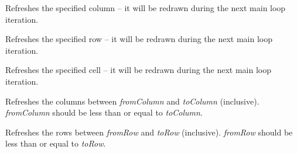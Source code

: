 
Refreshes the specified column -- it will be redrawn during the next main loop
iteration.


\label{wxhvscrolledwindowrefreshrow}


Refreshes the specified row -- it will be redrawn during the next main loop
iteration.


\label{wxhvscrolledwindowrefreshrowcolumn}


Refreshes the specified cell -- it will be redrawn during the next main loop
iteration.




\label{wxhvscrolledwindowrefreshcolumns}


Refreshes the columns between {\it fromColumn} and {\it toColumn} (inclusive).
{\it fromColumn} should be less than or equal to {\it toColumn}.




\label{wxhvscrolledwindowrefreshrows}


Refreshes the rows between {\it fromRow} and {\it toRow} (inclusive).
{\it fromRow} should be less than or equal to {\it toRow}.




\label{wxhvscrolledwindowrefreshrowscolumns}


